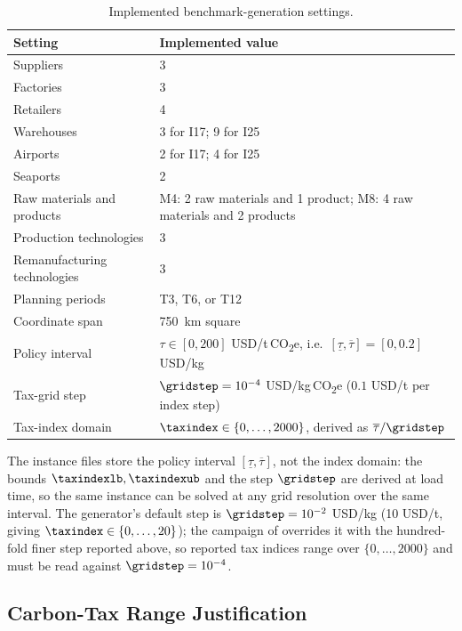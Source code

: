 \begin{table}[ht]
\centering
\caption{Implemented benchmark-generation settings.}
\label{tab:app_params}
\renewcommand{\arraystretch}{1.2}
\begin{tabularx}{\linewidth}{@{}lX@{}}
  \toprule
  \textbf{Setting} & \textbf{Implemented value} \\
  \midrule
  Suppliers & 3 \\
  Factories & 3 \\
  Retailers & 4 \\
  Warehouses & 3 for I17; 9 for I25 \\
  Airports & 2 for I17; 4 for I25 \\
  Seaports & 2 \\
  Raw materials and products
    & M4: 2 raw materials and 1 product; M8: 4 raw materials and
      2 products \\
  Production technologies & 3 \\
  Remanufacturing technologies & 3 \\
  Planning periods & T3, T6, or T12 \\
  Coordinate span & \SI{750}{\kilo\metre} square \\
  Policy interval & $\tau\in[0,200]$ USD/t\,CO\textsubscript{2}e,
    i.e.\ $[\underline{\tau},\overline{\tau}]=[0,0.2]$ USD/kg \\
  Tax-grid step & $\gridstep=10^{-4}$ USD/kg\,CO\textsubscript{2}e
    ($0.1$ USD/t per index step) \\
  Tax-index domain & $\taxindex\in\{0,\ldots,2000\}$, derived as
    $\overline{\tau}/\gridstep$ \\
  \bottomrule
\end{tabularx}
\end{table}

The instance files store the policy interval
$[\underline{\tau},\overline{\tau}]$, not the index domain: the bounds
$\taxindexlb,\taxindexub$ and the step $\gridstep$ are derived at load
time, so the same instance can be solved at any grid resolution over the
same interval. The generator's default step is
$\gridstep=10^{-2}$ USD/kg (10 USD/t, giving
$\taxindex\in\{0,\ldots,20\}$); the campaign of
 overrides it with the hundred-fold finer step
reported above, so reported tax indices range over
$\{0,\ldots,2000\}$ and must be read against $\gridstep=10^{-4}$.

\subsection{Carbon-Tax Range Justification}
\label{app:data:tax_range}

